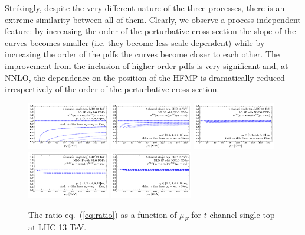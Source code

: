\documentclass[letter,11pt]{article}
\begin{document}
Strikingly, despite the very different nature of the three processes, there is an extreme similarity between all of them. Clearly, we observe a process-independent feature: by increasing the order of the perturbative cross-section the slope of the curves becomes smaller (i.e. they become less scale-dependent) while by increasing the order of the pdfs the curves become closer to each other. The improvement from the inclusion of higher order pdfs is very significant and, at NNLO, the dependence on the position of the HFMP is dramatically reduced irrespectively of the order of the perturbative cross-section.
%
\begin{figure}[t]
\centering
\includegraphics[trim=0.3cm 0.0cm 0.4cm 0.5cm,clip,width=0.32\textwidth]{./tj_mubdep_lo_lopdfs.pdf}
\includegraphics[trim=0.3cm 0.0cm 0.4cm 0.5cm,clip,width=0.32\textwidth]{./tj_mubdep_lo_nlopdfs.pdf}
\includegraphics[trim=0.3cm 0.0cm 0.4cm 0.5cm,clip,width=0.32\textwidth]{./tj_mubdep_lo_nnlopdfs.pdf} \\
\vskip -3.5mm
\hskip 51mm
\includegraphics[trim=0.3cm 0.0cm 0.4cm 0.5cm,clip,width=0.32\textwidth]{./tj_mubdep_nlo_nlopdfs.pdf}
\includegraphics[trim=0.3cm 0.0cm 0.4cm 0.5cm,clip,width=0.32\textwidth]{./tj_mubdep_nlo_nnlopdfs.pdf} \\
\vskip -2mm
\caption{The ratio eq.~(\ref{eq:ratio}) as a function of $\mu_F$ for $t$-channel single top at LHC 13 TeV.}
\label{fig:tj-mub-dep}
\end{figure}
\end{document}
